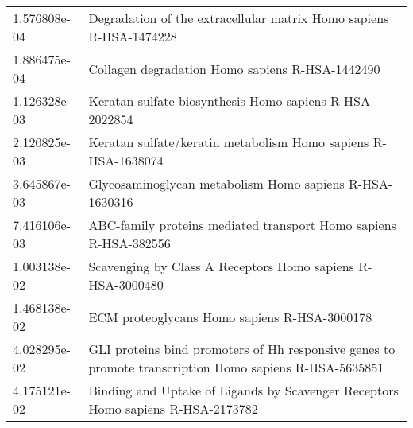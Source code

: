 \begin{longtable}{p{2.4cm}p{14.5cm}}
             1.576808e-04 &                                      Degradation of the extracellular matrix Homo sapiens R-HSA-1474228 \\
             1.886475e-04 &                                                         Collagen degradation Homo sapiens R-HSA-1442490 \\
             1.126328e-03 &                                                 Keratan sulfate biosynthesis Homo sapiens R-HSA-2022854 \\
             2.120825e-03 &                                           Keratan sulfate/keratin metabolism Homo sapiens R-HSA-1638074 \\
             3.645867e-03 &                                                 Glycosaminoglycan metabolism Homo sapiens R-HSA-1630316 \\
             7.416106e-03 &                                        ABC-family proteins mediated transport Homo sapiens R-HSA-382556 \\
             1.003138e-02 &                                              Scavenging by Class A Receptors Homo sapiens R-HSA-3000480 \\
             1.468138e-02 &                                                            ECM proteoglycans Homo sapiens R-HSA-3000178 \\
             4.028295e-02 &  GLI proteins bind promoters of Hh responsive genes to promote transcription Homo sapiens R-HSA-5635851 \\
             4.175121e-02 &                         Binding and Uptake of Ligands by Scavenger Receptors Homo sapiens R-HSA-2173782 \\
\end{longtable}


